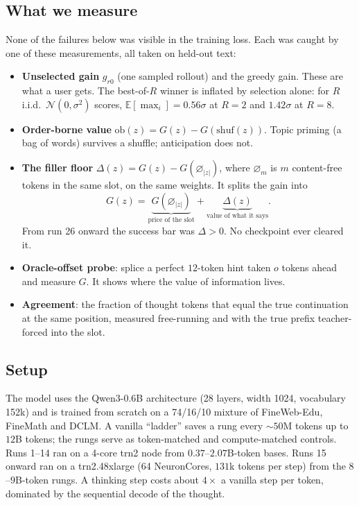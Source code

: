 \documentclass[11pt]{article}
\begin{document}
\subsection{What we measure}
None of the failures below was visible in the training loss. Each was caught by one of these measurements, all taken on held-out text:
\begin{itemize}\setlength{\itemsep}{1pt}
\item \textbf{Unselected gain} $g_{r0}$ (one sampled rollout) and the greedy gain. These are what a user gets. The best-of-$R$ winner is inflated by selection alone: for $R$ i.i.d.\ $\mathcal{N}(0,\sigma^2)$ scores, $\mathbb{E}[\max_i]=0.56\sigma$ at $R=2$ and $1.42\sigma$ at $R=8$.
\item \textbf{Order-borne value} $\mathrm{ob}(z)=G(z)-G(\mathrm{shuf}(z))$. Topic priming (a bag of words) survives a shuffle; anticipation does not.
\item \textbf{The filler floor} $\Delta(z)=G(z)-G(\varnothing_{|z|})$, where $\varnothing_m$ is $m$ content-free tokens in the same slot, on the same weights. It splits the gain into
\begin{equation}
G(z)=\underbrace{G(\varnothing_{|z|})}_{\text{price of the slot}}+\underbrace{\Delta(z)}_{\text{value of what it says}}.
\end{equation}
From run 26 onward the success bar was $\Delta>0$. No checkpoint ever cleared it.
\item \textbf{Oracle-offset probe}: splice a perfect $12$-token hint taken $o$ tokens ahead and measure $G$. It shows where the value of information lives.
\item \textbf{Agreement}: the fraction of thought tokens that equal the true continuation at the same position, measured free-running and with the true prefix teacher-forced into the slot.
\end{itemize}

\subsection{Setup}
The model uses the Qwen3-0.6B architecture (28 layers, width 1024, vocabulary 152k) and is trained from scratch on a 74/16/10 mixture of FineWeb-Edu, FineMath and DCLM. A vanilla ``ladder'' saves a rung every ${\sim}50$M tokens up to $12$B tokens; the rungs serve as token-matched and compute-matched controls. Runs 1--14 ran on a 4-core trn2 node from $0.37$--$2.07$B-token bases. Runs 15 onward ran on a trn2.48xlarge (64 NeuronCores, $131$k tokens per step) from the $8$--$9$B-token rungs. A thinking step costs about $4\times$ a vanilla step per token, dominated by the sequential decode of the thought.
\end{document}
